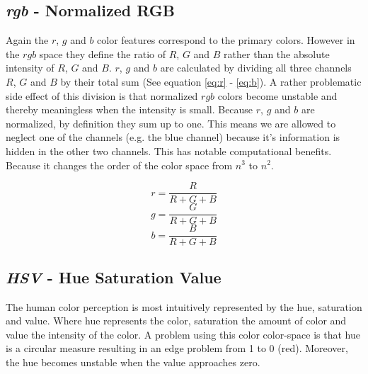 \documentclass[11pt]{article}
\begin{document}
\subsection{\textit{rgb} - Normalized RGB}
Again the $r$, $g$ and $b$  color features correspond to the primary colors.
However in the $rgb$ space they define the ratio of $R$, $G$ and $B$ rather than
the absolute intensity of $R$, $G$ and $B$. $r$, $g$ and $b$ are calculated by
dividing all three channels $R$, $G$ and $B$ by their total sum (See equation
\ref{eq:r} - \ref{eq:b}). A rather problematic side effect of this division is
that normalized $rgb$ colors become unstable and thereby meaningless when the
intensity is small. Because $r$, $g$ and $b$ are normalized, by definition they
sum up to one. This means we are allowed to neglect one of the channels (e.g.
the blue channel) because it's information is hidden in the other two channels.
This has notable computational benefits. Because it changes the order of the
color space from $n^3$ to $n^2$.

\begin{equation}
  r = \frac{R}{R+G+B}
  \label{eq:r}
\end{equation}
\begin{equation}
  g = \frac{G}{R+G+B}
  \label{eq:g}
\end{equation}
\begin{equation}
  b = \frac{B}{R+G+B}
  \label{eq:b}
\end{equation}

\subsection{\textit{HSV} - Hue Saturation Value}
The human color perception is most intuitively represented by the hue, saturation
and value. Where hue represents the color, saturation the amount of color and
value the intensity of the color. A problem using this color color-space is that
hue is a circular measure resulting in an edge problem from 1 to 0 (red).
Moreover, the hue becomes unstable when the value approaches zero.
\end{document}
